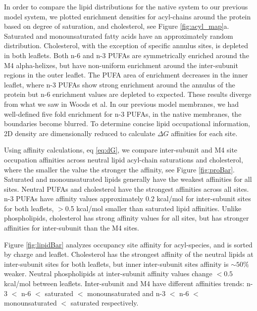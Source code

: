 In order to compare the lipid distributions for the native system to our previous model system, we plotted enrichment densities for acyl-chains around the protein based on degree of saturation, and cholesterol, see Figure \ref{fig:acyl_map}a. Saturated and monounsaturated fatty acids have an approximately random distribution. Cholesterol, with the exception of specific annulus sites, is depleted in both leaflets. Both n-6 and n-3 PUFAs are symmetrically enriched around the M4 alpha-helixes, but have non-uniform enrichment around the inter-subunit regions in the outer leaflet. The PUFA area of enrichment decreases in the inner leaflet, where n-3 PUFAs show strong enrichment around the annulus of the protein but n-6 enrichment values are depleted to expected. These results diverge from what we saw in Woods et al\cite{Woods2019}. In our previous model membranes, we had well-defined five fold enrichment for n-3 PUFAs, in the native membranes, the boundaries become blurred. To determine concise lipid occupational information, 2D density are dimensionally reduced to calculate $\Delta G$ affinities for each site.

Using affinity calculations, eq \ref{eq:dG}, we compare inter-subunit and M4 site occupation affinities across neutral lipid acyl-chain saturations and cholesterol, where the smaller the value the stronger the affinity, see Figure \ref{fig:proBar}. Saturated and monounsaturated lipids generally have the weakest affinities for all sites.  Neutral PUFAs and cholesterol have the strongest affinities across all sites. n-3 PUFAs have affinity values approximately 0.2 kcal/mol for inter-subunit sites for both leaflets, $>$0.5 kcal/mol smaller than saturated lipid affinities. Unlike phospholipids, cholesterol has strong affinity values for all sites, but has stronger affinities for inter-subunit  than the M4 sites.

Figure \ref{fig:lipidBar} analyzes occupancy site affinity for acyl-species, and is sorted by charge and leaflet. Cholesterol has the strongest affinity of the neutral lipids at inter-subunit sites for both leaflets, but inner inter-subunit sites affinity is $\sim 50 \%$ weaker. Neutral phospholipids at inter-subunit affinity values change $<0.5$ kcal/mol between leaflets.  Inter-subunit and M4 have different affinities trends: n-3 $<$ n-6 $<$ saturated $<$ monounsaturated and  n-3 $<$ n-6 $<$ monounsaturated $<$ saturated respectively. 


